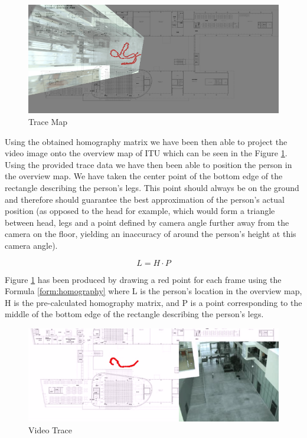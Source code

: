 \begin{figure}[h!]
	\centering
	\includegraphics[width=\textwidth]{final/images/trace_map.png}
	\caption{Trace Map}
	\label{fig:trace}
\end{figure}

Using the obtained homography matrix we have been then able to project the video image onto the overview map of ITU which can be seen in the Figure \ref{fig:trace}. Using the provided trace data we have then been able to position the person in the overview map. We have taken the center point of the bottom edge of the rectangle describing the person's legs. This point should always be on the ground and therefore should guarantee the best approximation of the person's actual position (as opposed to the head for example, which would form a triangle between head, legs and a point defined by camera angle further away from the camera on the floor, yielding an inaccuracy of around the person's height at this camera angle).

\begin{equation}
	L = H \cdot P
	\label{form:homography}
\end{equation}

Figure \ref{fig:trace} has been produced by drawing a red point for each frame using the Formula \ref{form:homography} where L is the person's location in the overview map, H is the pre-calculated homography matrix, and P is a point corresponding to the middle of the bottom edge of the rectangle describing the person's legs.

\begin{figure}[h!]
	\centering
	\includegraphics[width=\textwidth]{final/images/personlocationvideo.png}
	\caption{Video Trace}
	\label{fig:video_trace}
\end{figure}

